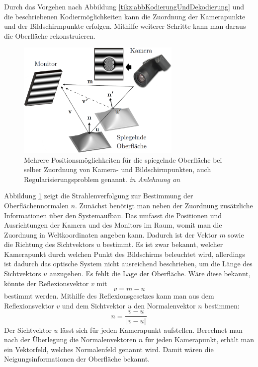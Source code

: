 Durch das Vorgehen nach Abbildung \ref{tikz:abbKodierungUndDekodierung} und die beschriebenen Kodiermöglichkeiten kann die Zuordnung der Kamerapunkte und der Bildschirmpunkte erfolgen.
Mithilfe weiterer Schritte kann man daraus die Oberfläche rekonstruieren.
%
\begin{figure}[H]
	\centering
	\includegraphics[width=0.7\textwidth]{02_grundlagenDerDeflektometrie/rekonstruktion/rekonstruktionUndRegularisierungsproblem/figures/regularisierungsproblem}
	\caption[Regularisierungsproblem]{Mehrere Positionsmöglichkeiten für die spiegelnde Oberfläche bei selber Zuordnung von Kamera- und Bildschirmpunkten, auch Regularisierungsproblem genannt. \textit{in Anlehnung an} \cite{stereoDeflektometrie}}
	\label{img:regularisierungsproblem}
\end{figure}
%
\noindent
Abbildung \ref{img:regularisierungsproblem} zeigt die Strahlenverfolgung zur Bestimmung der Oberflächennormalen $n$.
Zunächst benötigt man neben der Zuordnung zusätzliche Informationen über den Systemaufbau.
Das umfasst die Positionen und Ausrichtungen der Kamera und des Monitors im Raum, womit man die Zuordnung in Weltkoordinaten angeben kann.
Dadurch ist der Vektor $m$ sowie die Richtung des Sichtvektors $u$ bestimmt.
Es ist zwar bekannt, welcher Kamerapunkt durch welchen Punkt des Bildschirms beleuchtet wird, allerdings ist dadurch das optische System nicht ausreichend beschrieben, um die Länge des Sichtvektors $u$ anzugeben.
Es fehlt die Lage der Oberfläche.
Wäre diese bekannt, könnte der Reflexionsvektor $v$ mit 
\begin{equation*}
	v = m - u
\end{equation*}
bestimmt werden.
Mithilfe des Reflexionsgesetzes kann man aus dem Reflexionsvektor $v$ und dem Sichtvektor $u$ den Normalenvektor $n$ bestimmen:
%
\begin{equation}
	n = \dfrac{v - u}{\left\Vert v - u \right\Vert}
\end{equation}
%
Der Sichtvektor $u$ lässt sich für jeden Kamerapunkt aufstellen.
Berechnet man nach der Überlegung die Normalenvektoren $n$ für jeden Kamerapunkt, erhält man ein Vektorfeld, welches Normalenfeld genannt wird.
Damit wären die Neigungsinformationen der Oberfläche bekannt.

